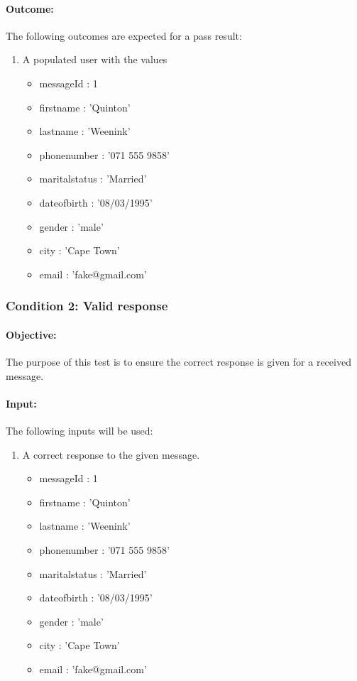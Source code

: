 \documentclass{article}
\begin{document}
\paragraph{Outcome:} The following outcomes are expected for a pass result:
\begin{enumerate}
	\item A populated user with the values
	\begin{itemize}
  	\item messageId : 1
    \item firstname : 'Quinton'
    \item lastname : 'Weenink'
    \item phonenumber : '071 555 9858'
    \item maritalstatus : 'Married'
    \item dateofbirth : '08/03/1995'
    \item gender : 'male'
    \item city : 'Cape Town'
    \item email : 'fake@gmail.com'
    \end{itemize}	  
\end{enumerate}
\subsubsection{Condition 2: Valid response }
\paragraph{Objective:} The purpose of this test is to ensure the correct response is given for a received message.
\paragraph{Input:} The following inputs will be used:
\begin{enumerate}
	\item A correct response to the given message.
	\begin{itemize}
  	\item messageId : 1
    \item firstname : 'Quinton'
    \item lastname : 'Weenink'
    \item phonenumber : '071 555 9858'
    \item maritalstatus : 'Married'
    \item dateofbirth : '08/03/1995'
    \item gender : 'male'
    \item city : 'Cape Town'
    \item email : 'fake@gmail.com'
    \end{itemize}	  
\end{enumerate}
\end{document}

